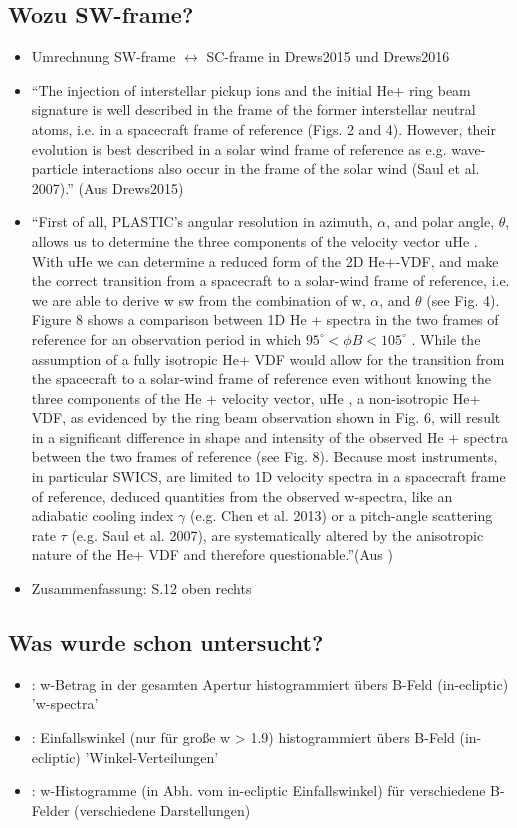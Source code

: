 \documentclass[]{article}
\begin{document}
\subsection{Wozu SW-frame?}
\begin{itemize}
	\item Umrechnung SW-frame $\leftrightarrow$ SC-frame in Drews2015 und Drews2016
	\item “The injection of interstellar pickup ions and the initial He+	ring beam signature is well described in the frame of the former	interstellar neutral atoms, i.e. in a spacecraft frame of reference (Figs. 2 and 4). However, their evolution is best described in a solar wind frame of reference as e.g. wave-particle interactions also occur in the frame of the solar wind (Saul et al. 2007).” (Aus Drews2015)
	\item “First of all, PLASTIC’s angular resolution in azimuth, $\alpha$, and polar angle, $\theta$, allows us to determine the three components of the velocity vector uHe . With uHe
	we can determine a reduced form of the 2D He+-VDF, and make
	the correct transition from a spacecraft to a solar-wind frame of reference, i.e. we are able to derive w sw from the combination	of w, $\alpha$, and $\theta$ (see Fig. 4). Figure 8 shows a comparison between 1D He + spectra in the two frames of reference for an observation period in which $95^\circ < \phi B < 105 ^\circ$ . While the assumption of a fully isotropic He+ VDF would allow for the transition from the spacecraft to a solar-wind frame of reference even without knowing the three components of the He + velocity vector, uHe , a non-isotropic He+ VDF, as evidenced by the ring beam observation shown in Fig. 6, will result in a significant difference in shape and intensity of the observed He + spectra between the two frames of reference (see Fig. 8). Because most instruments, in particular SWICS, are limited to 1D velocity spectra in a spacecraft frame of reference, deduced quantities from the
	observed w-spectra, like an adiabatic cooling index $\gamma$ (e.g. Chen et al. 2013) or a pitch-angle scattering rate $\tau$ (e.g. Saul et al.	2007), are systematically altered by the anisotropic nature of the He+ VDF and therefore questionable.”(Aus \cite{drews_2015})
	\item \cite{drews_2015} Zusammenfassung: S.12 oben rechts
\end{itemize}

\subsection{Was wurde schon untersucht?}
\begin{itemize}
	\item \cite{drews_2013}: w-Betrag in der gesamten Apertur histogrammiert übers B-Feld (in-ecliptic) 'w-spectra'
	\item \cite{drews_2013}: Einfallswinkel (nur für große w > 1.9) histogrammiert übers B-Feld (in-ecliptic) 'Winkel-Verteilungen'
	\item \cite{drews_2015}: w-Histogramme (in Abh. vom in-ecliptic Einfallswinkel) für verschiedene B-Felder (verschiedene Darstellungen)
\end{itemize}
%
%
%
\end{document}
